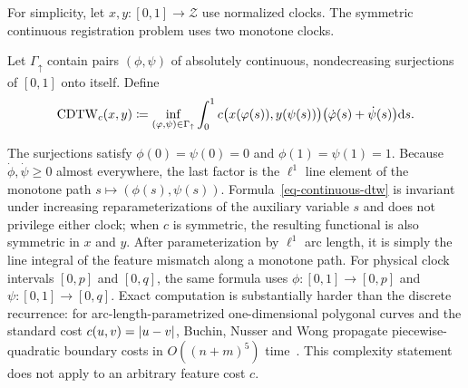 For simplicity, let $x,y:[0,1]\to\mathcal Z$ use normalized clocks. The symmetric continuous registration problem uses two monotone clocks.
\begin{defn}\label{def-continuous-dtw}
Let $\Gamma_\uparrow$ contain pairs $(\phi,\psi)$ of absolutely continuous, nondecreasing surjections of $[0,1]$ onto itself. Define
\begin{equation}\label{eq-continuous-dtw}
	\mathrm{CDTW}_c(x,y)
	\coloneqq
	\inf_{(\varphi,\psi)\in\Gamma_\uparrow}
	\int_0^1
	c\bigl(x(\varphi(s)),y(\psi(s))\bigr)
	\bigl(\dot{\varphi}(s)+\dot\psi(s)\bigr)\mathrm{d} s.
\end{equation}
\end{defn}
The surjections satisfy $\phi(0)=\psi(0)=0$ and $\phi(1)=\psi(1)=1$. Because $\dot\phi,\dot\psi\geq0$ almost everywhere, the last factor is the $\ell^1$ line element of the monotone path $s\mapsto(\phi(s),\psi(s))$. Formula~\eqref{eq-continuous-dtw} is invariant under increasing reparameterizations of the auxiliary variable $s$ and does not privilege either clock; when $c$ is symmetric, the resulting functional is also symmetric in $x$ and $y$. After parameterization by $\ell^1$ arc length, it is simply the line integral of the feature mismatch along a monotone path. For physical clock intervals $[0,p]$ and $[0,q]$, the same formula uses $\phi:[0,1]\to[0,p]$ and $\psi:[0,1]\to[0,q]$. Exact computation is substantially harder than the discrete recurrence: for arc-length-parametrized one-dimensional polygonal curves and the standard cost $c(u,v)=\left\lvert u-v\right\rvert$, Buchin, Nusser and Wong propagate piecewise-quadratic boundary costs in $O((n+m)^5)$ time~\cite{BuchinNusserWong2022CDTW}. This complexity statement does not apply to an arbitrary feature cost $c$.

